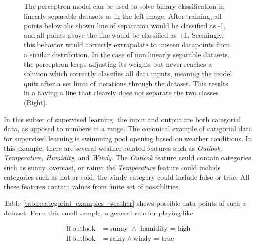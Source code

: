 \begin{figure}[!h]
\begin{subfigure}{0.49\textwidth}
  \end{subfigure}
  \caption{The perceptron model can be used to solve binary classification in linearly separable datasets as in the left image. After training, all points below the shown line of separation would be classified as -1, and all points above the line would be classified as +1. Seemingly, this behavior would correctly extrapolate to unseen datapoints from a similar distribution. In the case of non linearly separable datasets, the perceptron keeps adjusting its weights but never reaches a solution which correctly classifies all data inputs, meaning the model quits after a set limit of iterations through the dataset. This results in a having a line that clearely does not separate the two classes (Right).}
  \label{fig:perceptron_solution}
\end{figure}







In this subset of supervised learning, the input and output are both categorial data, as apposed to numbers in a range. The cononical example of categorial data for supervised learning is swimming pool opening based on weather conditions. In this example, there are several weather-related features such as \textit{Outlook, Temperature, Humidity,} and \textit{Windy}. The \textit{Outlook} feature could contain categories such as sunny, overcast, or rainy; the \textit{Temperature} feature could include categories such as hot or cold; the windy category could include false or true. All these features contain values from finite set of possiblities. 



Table \ref{table:categorial_examples_weather} shows possible data points of such a dataset. From this small sample, a general rule for playing like 

\begin{align*}
  	\textrm{If outlook}&=\textrm{sunny } \wedge \textrm{ humidity = high} \\
	\textrm{If outlook}&= \textrm{rainy} \wedge \textrm{windy = true}
\end{align*}

